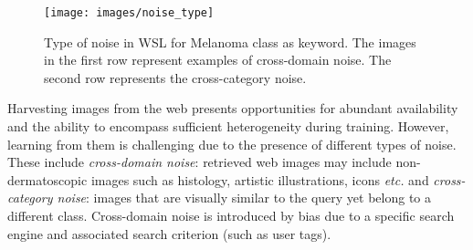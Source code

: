 \documentclass{llncs}
\begin{document}

\begin{wrapfigure}[11]{l}{0.5\textwidth}
\vspace{-25pt}
\centering
\texttt{[image: images/noise\_type]}
\caption{\footnotesize{Type of noise in WSL for Melanoma class as keyword. The images in the first row represent examples of cross-domain noise. The second row represents the cross-category noise.}}
\label{fig:noisetype}
\end{wrapfigure}Harvesting images from the web presents opportunities for abundant availability and the ability to encompass sufficient heterogeneity during training. However, learning from them is challenging due to the presence of different types of noise. These include \textit{cross-domain noise}: retrieved web images may include non-dermatoscopic images such as histology, artistic illustrations, icons \textit{etc.} and \textit{cross-category noise}: images that are visually similar to the query yet belong to a different class. Cross-domain noise is introduced by bias due to a specific search engine and associated search criterion (such as user tags).
\end{document}

